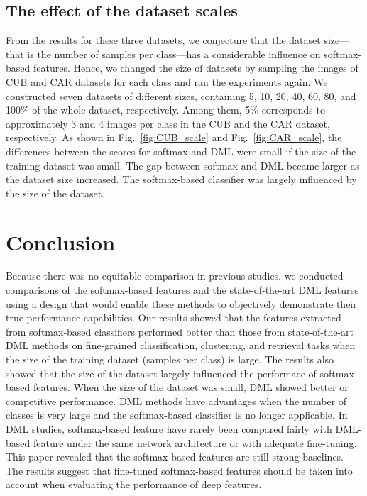 \documentclass[9pt,technote,compsoc]{./sty/IEEEtran}
\newcommand{\Fref}[1]{Fig.~\ref{#1}}
\begin{document}
\subsection{The effect of the dataset scales}
From the results for these three datasets, we conjecture that the dataset size---that is the number of samples per class---has a considerable influence on softmax-based features.
Hence, we changed the size of datasets by sampling the images of CUB and CAR datasets for each class and ran the experiments again.
We constructed seven datasets of different sizes, containing 5, 10, 20, 40, 60, 80, and 100\% of the whole dataset, respectively.
Among them, 5\% corresponds to approximately 3 and 4 images per class in the CUB and the CAR dataset, respectively.
As shown in \Fref{fig:CUB_scale} and \Fref{fig:CAR_scale}, the differences between the scores for softmax and DML
were small if the size of the training dataset was small.
The gap between softmax and DML became larger as the dataset size increased.
The softmax-based classifier was largely influenced by the size of the dataset.


\section{Conclusion}
Because there was no equitable comparison in previous studies, we conducted comparisons of the softmax-based features and the state-of-the-art DML features using a design that would enable these methods to objectively demonstrate their true performance capabilities.
Our results showed that the features extracted from softmax-based classifiers performed better than those from state-of-the-art DML methods \cite{song2016deep}\cite{sohn2016improved}\cite{song2017learnable} on fine-grained classification, clustering, and retrieval tasks when the size of the training dataset (samples per class) is large.
The results also showed that the size of the dataset largely influenced the performace of softmax-based features.
When the size of the dataset was small, DML showed better or competitive performance.
DML methods have advantages when the number of classes is very large and the softmax-based classifier is no longer applicable.
In DML studies, softmax-based feature have rarely been compared fairly with DML-based feature under the same network architecture or with adequate fine-tuning. This paper revealed that the softmax-based features are still strong baselines. The results suggest that fine-tuned softmax-based features should be taken into account when evaluating the performance of deep features.
\end{document}
